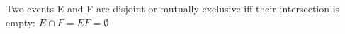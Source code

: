 \documentclass[12pt]{article}
\begin{document}
Two events E and F are disjoint or mutually exclusive iff their intersection is empty:\newline
$E\cap F=EF=\emptyset$


\end{document}
